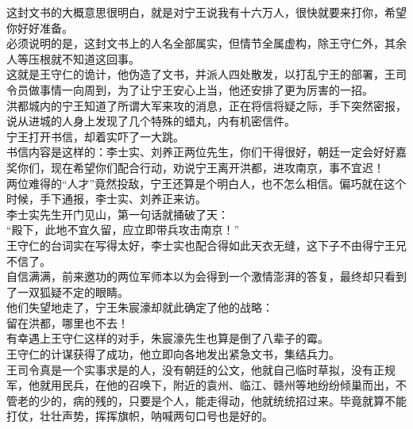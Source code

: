 \begin{multicols}{\theparacolNo}
这封文书的大概意思很明白，就是对宁王说我有十六万人，很快就要来打你，希望你好好准备。\\

必须说明的是，这封文书上的人名全部属实，但情节全属虚构，除王守仁外，其余人等压根就不知道这回事。\\

这就是王守仁的诡计，他伪造了文书，并派人四处散发，以打乱宁王的部署，王司令员做事情一向周到，为了让宁王安心上当，他还安排了更为厉害的一招。\\

洪都城内的宁王知道了所谓大军来攻的消息，正在将信将疑之际，手下突然密报，说从进城的人身上发现了几个特殊的蜡丸，内有机密信件。\\

宁王打开书信，却着实吓了一大跳。\\

书信内容是这样的：李士实、刘养正两位先生，你们干得很好，朝廷一定会好好嘉奖你们，现在希望你们配合行动，劝说宁王离开洪都，进攻南京，事不宜迟！\\

两位难得的“人才”竟然投敌，宁王还算是个明白人，也不怎么相信。偏巧就在这个时候，手下通报，李士实、刘养正来访。\\

李士实先生开门见山，第一句话就捅破了天：\\

“殿下，此地不宜久留，应立即带兵攻击南京！”\\

王守仁的台词实在写得太好，李士实也配合得如此天衣无缝，这下子不由得宁王兄不信了。\\

自信满满，前来邀功的两位军师本以为会得到一个激情澎湃的答复，最终却只看到了一双狐疑不定的眼睛。\\

他们失望地走了，宁王朱宸濠却就此确定了他的战略：\\

留在洪都，哪里也不去！\\

有幸遇上王守仁这样的对手，朱宸濠先生也算是倒了八辈子的霉。\\

王守仁的计谋获得了成功，他立即向各地发出紧急文书，集结兵力。\\

王司令真是一个实事求是的人，没有朝廷的公文，他就自己临时草拟，没有正规军，他就用民兵，在他的召唤下，附近的袁州、临江、赣州等地纷纷倾巢而出，不管老的少的，病的残的，只要是个人，能走得动，他就统统招过来。毕竟就算不能打仗，壮壮声势，挥挥旗帜，呐喊两句口号也是好的。\\


\end{multicols}
